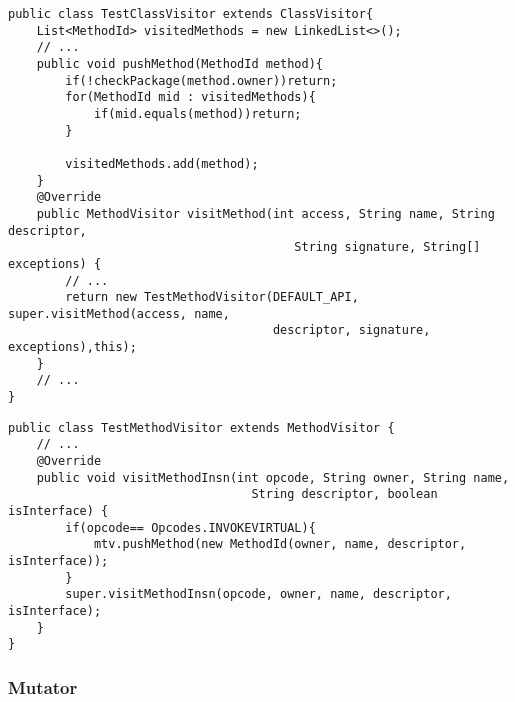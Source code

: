 \begin{lstlisting}[frame=single,float=!ht,caption={TestClassVisitor},captionpos=b,label={lst:tool_testclassvisitor}]
public class TestClassVisitor extends ClassVisitor{
    List<MethodId> visitedMethods = new LinkedList<>();
    // ...
    public void pushMethod(MethodId method){
        if(!checkPackage(method.owner))return;
        for(MethodId mid : visitedMethods){
            if(mid.equals(method))return;
        }

        visitedMethods.add(method);
    }
    @Override
    public MethodVisitor visitMethod(int access, String name, String descriptor, 
                                        String signature, String[] exceptions) {
        // ...
        return new TestMethodVisitor(DEFAULT_API, super.visitMethod(access, name, 
                                     descriptor, signature, exceptions),this);
    }
    // ...
}
\end{lstlisting}
\begin{lstlisting}[frame=single,float=!ht,caption={TestMethodVisitor},captionpos=b,label={lst:tool_testmethodvisitor}]
public class TestMethodVisitor extends MethodVisitor {
    // ...
    @Override
    public void visitMethodInsn(int opcode, String owner, String name, 
                                  String descriptor, boolean isInterface) {
        if(opcode== Opcodes.INVOKEVIRTUAL){
            mtv.pushMethod(new MethodId(owner, name, descriptor, isInterface));
        }
        super.visitMethodInsn(opcode, owner, name, descriptor, isInterface);
    }
}
\end{lstlisting}

\subsubsection{Mutator}

